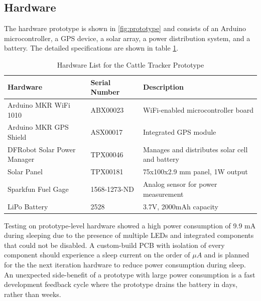 \documentclass[10pt]{cai}
\begin{document}
\subsection{Hardware}
The hardware prototype is shown in \ref{fig:prototype} and consists of an Arduino microcontroller, a GPS device, a solar array, a power distribution system, and a battery.
The detailed specifications are shown in table \ref{tab:hardware_inventory}.

\begin{table}[h!]
  \centering
  \caption{Hardware List for the Cattle Tracker Prototype}
  \begin{tabular}{|l|l|l|}
  \hline
  \textbf{Hardware} & \textbf{Serial Number} &  \textbf{Description} \\ \hline
  Arduino MKR WiFi 1010 & ABX00023 &  WiFi-enabled microcontroller board \\ \hline
  Arduino MKR GPS Shield & ASX00017 &  Integrated GPS module \\ \hline
  DFRobot Solar Power Manager & TPX00046 &  Manages and distributes solar cell and battery \\ \hline
  Solar Panel & TPX00181 &  75x100x2.9 mm panel, 1W output \\ \hline
  Sparkfun Fuel Gage & 1568-1273-ND & Analog sensor for power measurement \\ \hline
  LiPo Battery & 2528 &  3.7V, 2000mAh capacity \\ \hline
  \end{tabular}
  \label{tab:hardware_inventory}
  \end{table}

Testing on prototype-level hardware showed a high power consumption of 9.9 mA during sleeping due to the presence of multiple LEDs and integrated components that could not be disabled. 
A custom-build PCB with isolation of every component should experience a sleep current on the order of $\mu A$ and is planned for the the next iteration hardware to reduce power consumption during sleep.
An unexpected side-benefit of a prototype with large power consumption is a fast development feedback cycle where the prototype drains the battery in days, rather than weeks. 
\end{document}
